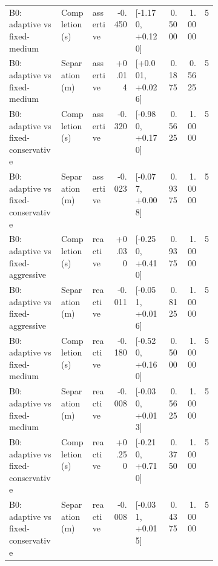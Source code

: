 \begin{table}[p]
\begin{tabular}{@{}L{0.25\linewidth}llrL{0.15\linewidth}rrr@{}}
B0: adaptive vs fixed-medium & Completion (s) & assertive & -0.450 & [-1.170, +0.120] & 0.5000 & 1.0000 & 5 \\
B0: adaptive vs fixed-medium & Separation (m) & assertive & +0.014 & [+0.001, +0.026] & 0.1875 & 0.5625 & 5 \\
B0: adaptive vs fixed-conservative & Completion (s) & assertive & -0.320 & [-0.980, +0.170] & 0.5625 & 1.0000 & 5 \\
B0: adaptive vs fixed-conservative & Separation (m) & assertive & -0.023 & [-0.077, +0.008] & 0.9375 & 1.0000 & 5 \\
B0: adaptive vs fixed-aggressive & Completion (s) & reactive & +0.030 & [-0.250, +0.410] & 0.9375 & 1.0000 & 5 \\
B0: adaptive vs fixed-aggressive & Separation (m) & reactive & -0.011 & [-0.051, +0.016] & 0.8125 & 1.0000 & 5 \\
B0: adaptive vs fixed-medium & Completion (s) & reactive & -0.180 & [-0.520, +0.160] & 0.5000 & 1.0000 & 5 \\
B0: adaptive vs fixed-medium & Separation (m) & reactive & -0.008 & [-0.030, +0.013] & 0.5625 & 1.0000 & 5 \\
B0: adaptive vs fixed-conservative & Completion (s) & reactive & +0.250 & [-0.210, +0.710] & 0.3750 & 1.0000 & 5 \\
B0: adaptive vs fixed-conservative & Separation (m) & reactive & -0.008 & [-0.031, +0.015] & 0.4375 & 1.0000 & 5 \\
\bottomrule
\end{tabular}
\end{table}
